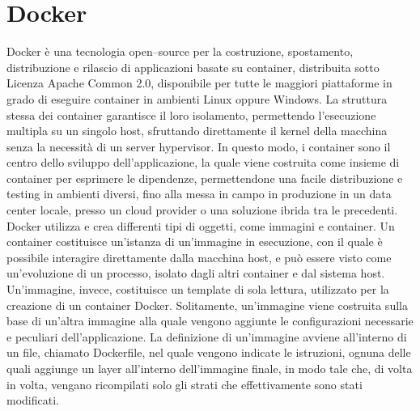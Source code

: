 \section{Docker}
Docker è una tecnologia open–source per la costruzione, spostamento, distribuzione e rilascio di
applicazioni basate su container, distribuita sotto Licenza Apache Common 2.0, disponibile per
tutte le maggiori piattaforme in grado di eseguire container in ambienti Linux oppure Windows.
La struttura stessa dei container garantisce il loro isolamento, permettendo l’esecuzione multipla
su un singolo host, sfruttando direttamente il kernel della macchina senza la necessità di un server
hypervisor. In questo modo, i container sono il centro dello sviluppo dell’applicazione, la quale
viene costruita come insieme di container per esprimere le dipendenze, permettendone una facile
distribuzione e testing in ambienti diversi, fino alla messa in campo in produzione in un data
center locale, presso un cloud provider o una soluzione ibrida tra le precedenti.
Docker utilizza e crea differenti tipi di oggetti, come immagini e container. Un container costituisce 
un’istanza di un’immagine in esecuzione, con il quale è possibile interagire direttamente dalla
macchina host, e può essere visto come un’evoluzione di un processo, isolato dagli altri container
e dal sistema host.
Un’immagine, invece, costituisce un template di sola lettura, utilizzato per la creazione di un
container Docker. Solitamente, un’immagine viene costruita sulla base di un’altra immagine alla
quale vengono aggiunte le configurazioni necessarie e peculiari dell’applicazione. La definizione
di un’immagine avviene all’interno di un file, chiamato Dockerfile, nel quale vengono indicate
le istruzioni, ognuna delle quali aggiunge un layer all’interno dell’immagine finale, in modo tale
che, di volta in volta, vengano ricompilati solo gli strati che effettivamente sono stati modificati.